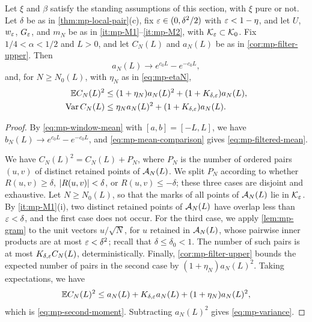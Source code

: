 \begin{theorem}\label{thm:mp-count}
Let $\xi$ and $\beta$ satisfy the standing assumptions of this section, with $\xi$ pure or not. Let $\delta$ be as in \cref{thm:mp-local-pair}(c), fix $\varepsilon\in(0,\delta^2/2)$ with $\varepsilon<1-\eta$, and let $U$, $w_\varepsilon$, $G_\varepsilon$, and $m_N$ be as in \ref{it:mp-M1}--\ref{it:mp-M2}, with $\mathcal K_\varepsilon\subset\mathcal K_0$. Fix $1/4<\alpha<1/2$ and $L>0$, and let $C_N(L)$ and $a_N(L)$ be as in \cref{cor:mp-filter-upper}. Then
\begin{equation}\label{eq:mp-filtered-mean}
a_N(L)\longrightarrow e^{c_0L}-e^{-c_0L},
\end{equation}
and, for $N\ge N_0(L)$, with $\eta_N$ as in \eqref{eq:mp-etaN},
\begin{align}
\mathbb E C_N(L)^2&\le(1+\eta_N)a_N(L)^2+(1+K_{\delta,\varepsilon})a_N(L),\label{eq:mp-second-moment}\\
\operatorname{Var} C_N(L)&\le\eta_Na_N(L)^2+(1+K_{\delta,\varepsilon})a_N(L).\label{eq:mp-variance}
\end{align}
\end{theorem}

\begin{proof}
By \eqref{eq:mp-window-mean} with $[a,b]=[-L,L]$, we have $b_N(L)\to e^{c_0L}-e^{-c_0L}$, and \eqref{eq:mp-mean-comparison} gives \eqref{eq:mp-filtered-mean}.

We have $C_N(L)^2=C_N(L)+P_N$, where $P_N$ is the number of ordered pairs $(u,v)$ of distinct retained points of $\mathcal A_N(L)$. We split $P_N$ according to whether $R(u,v)\ge\delta$, $\left|R(u,v)\right|<\delta$, or $R(u,v)\le-\delta$; these three cases are disjoint and exhaustive. Let $N\ge N_0(L)$, so that the marks of all points of $\mathcal A_N(L)$ lie in $\mathcal K_\varepsilon$. By \ref{it:mp-M1}(i), two distinct retained points of $\mathcal A_N(L)$ have overlap less than $\varepsilon<\delta$, and the first case does not occur. For the third case, we apply \cref{lem:mp-gram} to the unit vectors $u/\sqrt N$, for $u$ retained in $\mathcal A_N(L)$, whose pairwise inner products are at most $\varepsilon<\delta^2$; recall that $\delta\le\delta_0<1$. The number of such pairs is at most $K_{\delta,\varepsilon}C_N(L)$, deterministically. Finally, \cref{cor:mp-filter-upper} bounds the expected number of pairs in the second case by $(1+\eta_N)a_N(L)^2$. Taking expectations, we have
\[
\mathbb E C_N(L)^2\le a_N(L)+K_{\delta,\varepsilon}a_N(L)+(1+\eta_N)a_N(L)^2,
\]
which is \eqref{eq:mp-second-moment}. Subtracting $a_N(L)^2$ gives \eqref{eq:mp-variance}.
\end{proof}

